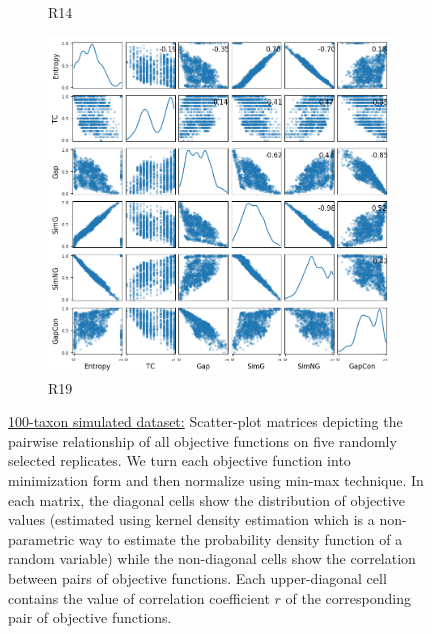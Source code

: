 \begin{figure}[!htbp]
\begin{adjustwidth}{-1cm}{-1cm}
\begin{subfigure}{0.35\textwidth}
			\caption{R14}
		\end{subfigure}
		\begin{subfigure}{0.35\textwidth}
			\includegraphics[width=\columnwidth]{Figure/6-obj-old/R19/fig/scatter_mattrix}
			\caption{R19}
		\end{subfigure}
		\caption[Scatter-plot matrices for six objective functions on 100-taxon simulated dataset]{\underline{100-taxon simulated dataset:} Scatter-plot matrices depicting the pairwise relationship of all objective functions on five randomly selected replicates. We turn each objective function into minimization form and then normalize using min-max technique. In each matrix, the diagonal cells show the distribution of objective values (estimated using kernel density estimation which is a non-parametric way to estimate the probability density function of a random variable) while the non-diagonal cells show the correlation between pairs of objective functions. Each upper-diagonal cell contains the value of correlation coefficient $r$ of the corresponding pair of objective functions.}
		\label{fig:new_nature_obj}
	\end{adjustwidth}
\end{figure}
